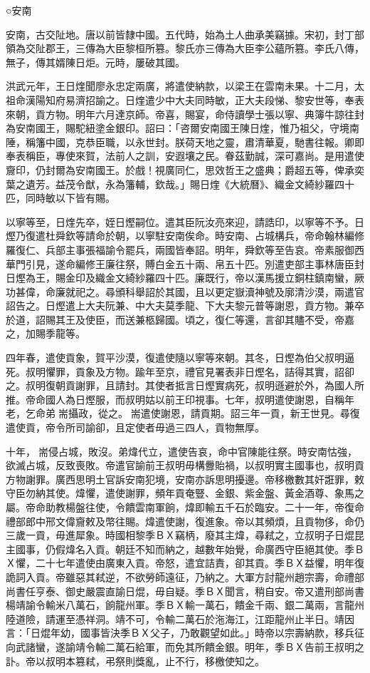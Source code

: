 
\begin{pinyinscope}
○安南

安南，古交阯地。唐以前皆隸中國。五代時，始為土人曲承美竊據。宋初，封丁部領為交阯郡王，三傳為大臣黎桓所篡。黎氏亦三傳為大臣李公蘊所篡。李氏八傳，無子，傳其婿陳日炬。元時，屢破其國。

洪武元年，王日煃聞廖永忠定兩廣，將遣使納款，以梁王在雲南未果。十二月，太祖命漢陽知府易濟招諭之。日煃遣少中大夫同時敏，正大夫段悌、黎安世等，奉表來朝，貢方物。明年六月達京師。帝喜，賜宴，命侍讀學士張以寧、典簿牛諒往封為安南國王，賜駝紐塗金銀印。詔曰：「咨爾安南國王陳日煃，惟乃祖父，守境南陲，稱籓中國，克恭臣職，以永世封。朕荷天地之靈，肅清華夏，馳書往報。卿即奉表稱臣，專使來賀，法前人之訓，安遐壤之民。眷茲勤誠，深可嘉尚。是用遣使齎印，仍封爾為安南國王。於戲！視廣同仁，思效哲王之盛典；爵超五等，俾承奕葉之遺芳。益茂令猷，永為籓輔，欽哉。」賜日煃《大統曆》、織金文綺紗羅四十匹，同時敏以下皆有賜。

以寧等至，日煃先卒，姪日熞嗣位。遣其臣阮汝亮來迎，請誥印，以寧等不予。日熞乃復遣杜舜欽等請命於朝，以寧駐安南俟命。時安南、占城構兵，帝命翰林編修羅復仁、兵部主事張福諭令罷兵，兩國皆奉詔。明年，舜欽等至告哀。帝素服御西華門引見，遂命編修王廉往祭，賻白金五十兩、帛五十匹。別遣吏部主事林唐臣封日熞為王，賜金印及織金文綺紗羅四十匹。廉既行，帝以漢馬援立銅柱鎮南蠻，厥功甚偉，命廉就祀之。尋頒科舉詔於其國，且以更定嶽瀆神號及廓清沙漠，兩遣官詔告之。日熞遣上大夫阮兼、中大夫莫季龍、下大夫黎元普等謝恩，貢方物。兼卒於道，詔賜其王及使臣，而送兼柩歸國。頃之，復仁等還，言卻其贐不受，帝嘉之，加賜季龍等。

四年春，遣使貢象，賀平沙漠，復遣使隨以寧等來朝。其冬，日熞為伯父叔明逼死。叔明懼罪，貢象及方物。踰年至京，禮官見署表非日熞名，詰得其實，詔卻之。叔明復朝貢謝罪，且請封。其使者抵言日熞實病死，叔明遜避於外，為國人所推。帝命國人為日熞服，而叔明姑以前王印視事。七年，叔明遣使謝恩，自稱年老，乞命弟耑攝政，從之。耑遣使謝恩，請貢期。詔三年一貢，新王世見。尋復遣使貢，帝令所司諭卻，且定使者毋過三四人，貢物無厚。

十年，耑侵占城，敗沒。弟煒代立，遣使告哀，命中官陳能往祭。時安南怙強，欲滅占城，反致喪敗。帝遣官諭前王叔明毋構釁貽禍，以叔明實主國事也，叔明貢方物謝罪。廣西思明土官訴安南犯境，安南亦訴思明擾邊。帝移檄數其奸誑罪，敕守臣勿納其使。煒懼，遣使謝罪，頻年貢奄豎、金銀、紫金盤、黃金酒尊、象馬之屬。帝命助教楊盤往使，令饋雲南軍餉，煒即輸五千石於臨安。二十一年，帝復命禮部郎中邢文偉齎敕及幣往賜。煒遣使謝，復進象。帝以其頻煩，且貢物侈，命仍三歲一貢，毋進犀象。時國相黎季ＢＸ竊柄，廢其主煒，尋弒之，立叔明子日焜昆主國事，仍假煒名入貢。朝廷不知而納之，越數年始覺，命廣西守臣絕其使。季ＢＸ懼，二十七年遣使由廣東入貢。帝怒，遣宜詰責，卻其貢。季ＢＸ益懼，明年復詭詞入貢。帝雖惡其弒逆，不欲勞師遠征，乃納之。大軍方討龍州趙宗壽，命禮部尚書任亨泰、御史嚴震直諭日焜，毋自疑。季ＢＸ聞言，稍自安。帝又遣刑部尚書楊靖諭令輸米八萬石，餉龍州軍。季ＢＸ輸一萬石，饋金千兩、銀二萬兩，言龍州陸道險，請運至憑祥洞。靖不可，令輸二萬石於沲海江，江距龍州止半日。靖因言：「日焜年幼，國事皆決季ＢＸ父子，乃敢觀望如此。」時帝以宗壽納款，移兵征向武諸蠻，遂諭靖令輸二萬石給軍，而免其所饋金銀。明年，季ＢＸ告前王叔明之訃。帝以叔明本篡弒，弔祭則獎亂，止不行，移檄使知之。


\end{pinyinscope}
